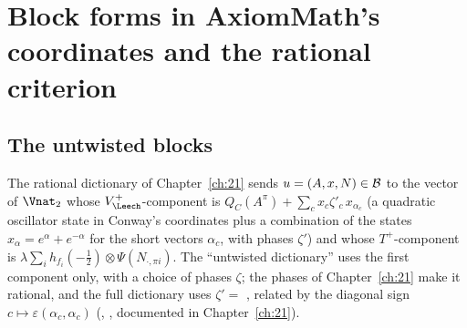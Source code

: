 \section{Block forms in AxiomMath's coordinates and the rational criterion}\label{ch22:sec:blocks}

\subsection{The untwisted blocks}

The rational dictionary of Chapter~\ref{ch:21} sends $u=(A,x,N)\in\mathcal{B}$ to the vector of $\Vnat_2$ whose
$V_\Leech^+$-component is $Q_C(A^\pi)+\sum_c x_c\zeta'_c\,x_{\alpha_c}$ (a quadratic oscillator state in Conway's
coordinates plus a combination of the states $x_\alpha=e^\alpha+e^{-\alpha}$ for the short vectors $\alpha_c$, with phases
$\zeta'$) and whose $T^+$-component is $\lambda\sum_i h_{f_i}(-\tfrac12)\otimes\Psi(N_{\cdot,\pi i})$.  The ``untwisted
dictionary''  uses the first component only, with a choice of phases $\zeta$; the phases
 of Chapter~\ref{ch:21} make it rational, and the full dictionary uses
$\zeta'=$ , related by the diagonal sign $c\mapsto\varepsilon(\alpha_c,\alpha_c)$ (,
, documented in Chapter~\ref{ch:21}).

